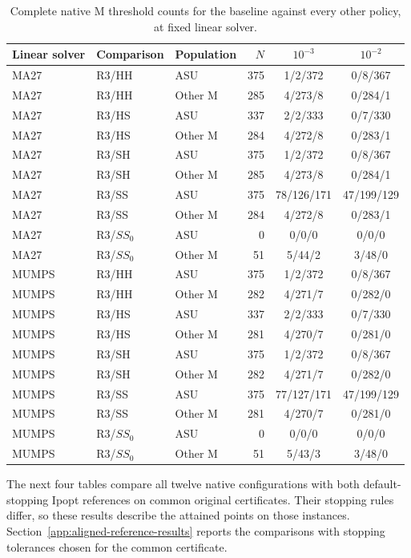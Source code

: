 \documentclass[pdflatex,sn-mathphys-num]{sn-jnl}
\theoremstyle{thmstyleone}
\theoremstyle{thmstylethree}
\begin{document}
\begin{table}[!htbp]
\centering\small
\caption{Complete native M threshold counts for the baseline against
every other policy, at fixed linear solver.}
\label{tab:native-M-thresholds}

\begin{tabular}{@{}lllrcc@{}}
\toprule
Linear solver & Comparison & Population & $N$ & $10^{-3}$ & $10^{-2}$\\
\midrule
MA27 & R3/HH & ASU & 375 & 1/2/372 & 0/8/367\\
MA27 & R3/HH & Other M & 285 & 4/273/8 & 0/284/1\\
MA27 & R3/HS & ASU & 337 & 2/2/333 & 0/7/330\\
MA27 & R3/HS & Other M & 284 & 4/272/8 & 0/283/1\\
MA27 & R3/SH & ASU & 375 & 1/2/372 & 0/8/367\\
MA27 & R3/SH & Other M & 285 & 4/273/8 & 0/284/1\\
MA27 & R3/SS & ASU & 375 & 78/126/171 & 47/199/129\\
MA27 & R3/SS & Other M & 284 & 4/272/8 & 0/283/1\\
MA27 & R3/$SS_0$ & ASU & 0 & 0/0/0 & 0/0/0\\
MA27 & R3/$SS_0$ & Other M & 51 & 5/44/2 & 3/48/0\\
MUMPS & R3/HH & ASU & 375 & 1/2/372 & 0/8/367\\
MUMPS & R3/HH & Other M & 282 & 4/271/7 & 0/282/0\\
MUMPS & R3/HS & ASU & 337 & 2/2/333 & 0/7/330\\
MUMPS & R3/HS & Other M & 281 & 4/270/7 & 0/281/0\\
MUMPS & R3/SH & ASU & 375 & 1/2/372 & 0/8/367\\
MUMPS & R3/SH & Other M & 282 & 4/271/7 & 0/282/0\\
MUMPS & R3/SS & ASU & 375 & 77/127/171 & 47/199/129\\
MUMPS & R3/SS & Other M & 281 & 4/270/7 & 0/281/0\\
MUMPS & R3/$SS_0$ & ASU & 0 & 0/0/0 & 0/0/0\\
MUMPS & R3/$SS_0$ & Other M & 51 & 5/43/3 & 3/48/0\\
\bottomrule
\end{tabular}


\end{table}

The next four tables compare all twelve native configurations with both
default-stopping Ipopt references on common original certificates. Their
stopping rules differ, so these results describe the attained points on
those instances. Section~\ref{app:aligned-reference-results} reports the comparisons with
stopping tolerances chosen for the common certificate.
\end{document}
